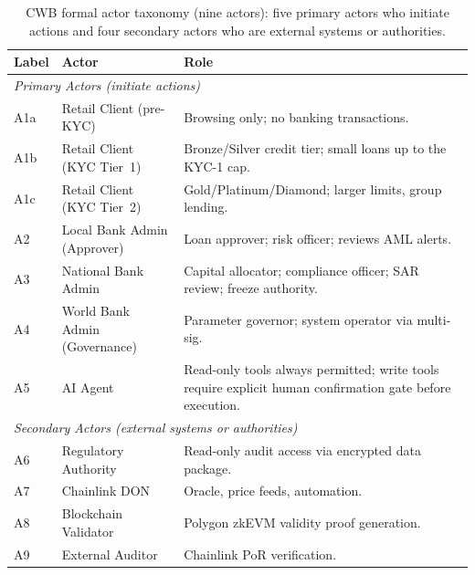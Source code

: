 \documentclass[12pt,a4paper]{report}
\begin{document}
\begin{table}[H]
\centering
\caption{CWB formal actor taxonomy (nine actors): five primary actors who initiate actions and four secondary actors who are external systems or authorities.}
\label{tab:actor-taxonomy}
\renewcommand{\arraystretch}{1.3}
\small
\begin{tabular}{p{1.2cm}p{4.2cm}p{7.9cm}}
\hline
\textbf{Label} & \textbf{Actor} & \textbf{Role} \\
\hline
\multicolumn{3}{l}{\textit{Primary Actors (initiate actions)}} \\
\hline
A1a & Retail Client (pre-KYC) & Browsing only; no banking transactions. \\
\hline
A1b & Retail Client (KYC Tier~1) & Bronze/Silver credit tier; small loans up to the KYC-1 cap. \\
\hline
A1c & Retail Client (KYC Tier~2) & Gold/Platinum/Diamond; larger limits, group lending. \\
\hline
A2 & Local Bank Admin (Approver) & Loan approver; risk officer; reviews AML alerts. \\
\hline
A3 & National Bank Admin & Capital allocator; compliance officer; SAR review; freeze authority. \\
\hline
A4 & World Bank Admin (Governance) & Parameter governor; system operator via multi-sig. \\
\hline
A5 & AI Agent & Read-only tools always permitted; write tools require explicit human confirmation gate before execution. \\
\hline
\multicolumn{3}{l}{\textit{Secondary Actors (external systems or authorities)}} \\
\hline
A6 & Regulatory Authority & Read-only audit access via encrypted data package. \\
\hline
A7 & Chainlink DON & Oracle, price feeds, automation. \\
\hline
A8 & Blockchain Validator & Polygon zkEVM validity proof generation. \\
\hline
A9 & External Auditor & Chainlink PoR verification. \\
\hline
\end{tabular}
\end{table}
\end{document}
